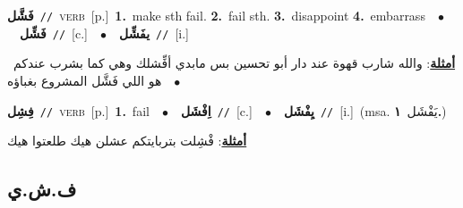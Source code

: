 \documentclass[10pt,a4paper,twoside]{article} %
\begin{document}
\begin{multicols}{2}
{\setlength\topsep{0pt}\textbf{\foreignlanguage{arabic}{فَشَّل}}\ {\color{gray}\texttt{//}\color{black}}\ \textsc{verb}\ [p.]\ \textbf{1.}~make sth fail.  \textbf{2.}~fail sth.  \textbf{3.}~disappoint  \textbf{4.}~embarrass\ \ $\bullet$\ \ \setlength\topsep{0pt}\textbf{\foreignlanguage{arabic}{فَشِّل}}\ {\color{gray}\texttt{//}\color{black}}\ [c.]\ \ $\bullet$\ \ \setlength\topsep{0pt}\textbf{\foreignlanguage{arabic}{يفَشِّل}}\ {\color{gray}\texttt{//}\color{black}}\ [i.]\  \begin{flushright}\color{gray}\foreignlanguage{arabic}{\textbf{\underline{\foreignlanguage{arabic}{أمثلة}}}: والله شارب قهوة عند دار أبو تحسين بس مابدي أفِّشلك وهي كما بشرب عندكم\ $\bullet$\ \  هو اللي فَشَّل المشروع بغباؤه}\end{flushright}\color{black}} \vspace{2mm}

{\setlength\topsep{0pt}\textbf{\foreignlanguage{arabic}{فِشِل}}\ {\color{gray}\texttt{//}\color{black}}\ \textsc{verb}\ [p.]\ \textbf{1.}~fail\ \ $\bullet$\ \ \setlength\topsep{0pt}\textbf{\foreignlanguage{arabic}{اِفْشَل}}\ {\color{gray}\texttt{//}\color{black}}\ [c.]\ \ $\bullet$\ \ \setlength\topsep{0pt}\textbf{\foreignlanguage{arabic}{يِفْشَل}}\ {\color{gray}\texttt{//}\color{black}}\ [i.]\ \color{gray}(msa. \foreignlanguage{arabic}{يَفْشَل}~\foreignlanguage{arabic}{\textbf{١.}})\color{black}\  \begin{flushright}\color{gray}\foreignlanguage{arabic}{\textbf{\underline{\foreignlanguage{arabic}{أمثلة}}}: فْشِلت بتربايتكم عشلن هيك طلعتوا هيك}\end{flushright}\color{black}} \vspace{2mm}

\vspace{-3mm}
\subsection*{\color{blue}\foreignlanguage{arabic}{ف.ش.ي}\color{blue}{}} 


\end{multicols}
\end{document}
